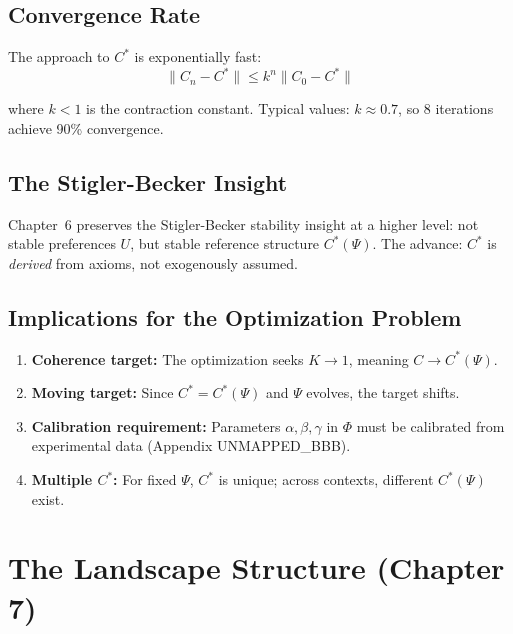 \subsection{Convergence Rate}

The approach to $C^*$ is exponentially fast:
\begin{equation}
\|C_n - C^*\| \leq k^n \|C_0 - C^*\|
\label{eq:mp-cstar-rate}
\end{equation}

where $k < 1$ is the contraction constant. Typical values: $k \approx 0.7$, so 8 iterations achieve 90\% convergence.

\subsection{The Stigler-Becker Insight}

Chapter~6 preserves the Stigler-Becker stability insight at a higher level:
not stable preferences $U$, but stable reference structure $C^*(\Psi)$.
The advance: $C^*$ is \textit{derived} from axioms, not exogenously assumed.

\subsection{Implications for the Optimization Problem}

\begin{enumerate}
\item \textbf{Coherence target:} The optimization seeks $K \to 1$, meaning $C \to C^*(\Psi)$.
\item \textbf{Moving target:} Since $C^* = C^*(\Psi)$ and $\Psi$ evolves, the target shifts.
\item \textbf{Calibration requirement:} Parameters $\alpha, \beta, \gamma$ in $\Phi$ must be calibrated from experimental data (Appendix UNMAPPED_BBB).
\item \textbf{Multiple $C^*$:} For fixed $\Psi$, $C^*$ is unique; across contexts, different $C^*(\Psi)$ exist.
\end{enumerate}

\section{The Landscape Structure (Chapter 7)}
\label{sec:mp-landscape}


